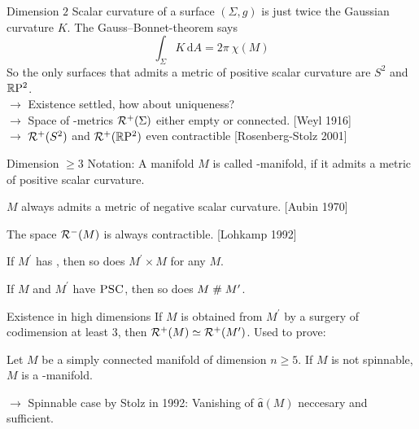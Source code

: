 \documentclass{presis}
\begin{document}
\begin{frame}{Dimension $2$}
    Scalar curvature of a surface $(\Sigma, g)$ is just twice the Gaussian curvature $K$.\pause{}
    The Gauss--Bonnet-theorem says 
    \begin{equation*}
        \int_\Sigma K \,\mathrm{d}A = 2\pi \:\chi(M)
    \end{equation*}\pause
    So the only surfaces that admits a metric of positive scalar curvature are \pause{} $S^2$ and $\mathbb{R}\mathrm{P}^2$.\\\pause
    $\rightarrow$ Existence settled, how about uniqueness?\\\pause
    $\rightarrow$ Space of \psc-metrics $\mathcal{R}^+(\Sigma)$ either empty or connected. [Weyl 1916]\\\pause
    $\rightarrow$ $\mathcal{R}^+(S^2)$ and $\mathcal{R}^+(\mathbb{R}\mathrm{P}^2)$ even contractible [Rosenberg-Stolz 2001]
\end{frame}

\begin{frame}{Dimension $\geq 3$}
    Notation: \pause{} A manifold $M$ is called \psc-manifold, if it admits a metric of positive scalar curvature.\pause
    \begin{vfilleditems}
    \item $M$ always admits a metric of negative scalar curvature. [Aubin 1970]\pause
    \item The space $\mathcal{R}^-(M)$ is always contractible. [Lohkamp 1992]\pause
    \item If $M^\prime$ has \psc, then so does $M^\prime\times M$ for any $M$.\pause
    \item If $M$ and $M^\prime$ have $\textsc{PSC}$, then so does $M\mathrel\# M^\prime$.\pause
    \end{vfilleditems}
    
\end{frame}

\begin{frame}{Existence in high dimensions}
    If $M$ is obtained from $M^\prime$ by a surgery of codimension at least $3$, then $\mathcal{R}^+(M) \simeq \mathcal{R}^+(M^\prime)$.\pause{} Used to prove:
    \begin{thm}
    Let $M$ be a simply connected manifold of dimension $n \geq 5$. If $M$ is not spinnable, $M$ is a \psc-manifold.
    \end{thm}\pause
    $\rightarrow$ Spinnable case by Stolz in 1992: Vanishing of $\hat{\mathfrak{a}}(M)$ neccesary and sufficient.
\end{frame}
\end{document}

